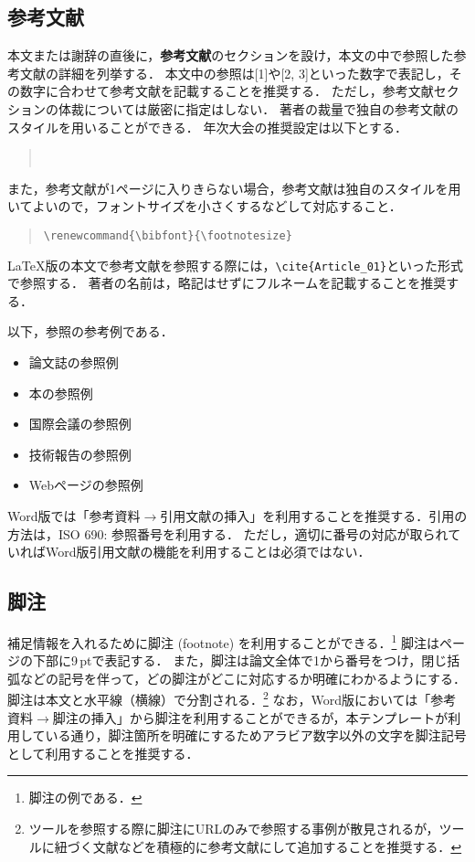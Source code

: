 \documentclass[
  platex, dvipdfmx,  %
]{nlp2025}
\begin{document}
\subsection{参考文献}
本文または謝辞の直後に，\textbf{参考文献}のセクションを設け，本文の中で参照した参考文献の詳細を列挙する．
本文中の参照は[1]や[2, 3]といった数字で表記し，その数字に合わせて参考文献を記載することを推奨する．
ただし，参考文献セクションの体裁については厳密に指定はしない．
著者の裁量で独自の参考文献のスタイルを用いることができる．
年次大会の推奨設定は以下とする．
\begin{quote}
\verb||\\
\verb||
\end{quote}
%
また，参考文献が1ページに入りきらない場合，参考文献は独自のスタイルを用いてよいので，フォントサイズを小さくするなどして対応すること．
\begin{quote}
\verb|\renewcommand{\bibfont}{\footnotesize}|
\end{quote}



LaTeX版の本文で参考文献を参照する際には，\verb|\cite{Article_01}|といった形式で参照する．
%
著者の名前は，略記はせずにフルネームを記載することを推奨する．

以下，参照の参考例である．
\begin{itemize}
\item 論文誌の参照例 \cite{Article_01}
\item 本の参照例 \cite{Book_02}
\item 国際会議の参照例 \cite{Inproc_03}
\item 技術報告の参照例 \cite{Techrep_05}
\item Webページの参照例 \cite{Web_06}
\end{itemize}

Word版では「参考資料$\xrightarrow{}$引用文献の挿入」を利用することを推奨する．引用の方法は，ISO 690: 参照番号を利用する．
ただし，適切に番号の対応が取られていればWord版引用文献の機能を利用することは必須ではない．


\subsection{脚注}
補足情報を入れるために脚注 (footnote) を利用することができる．\footnote{脚注の例である．}
脚注はページの下部に9\,ptで表記する．
また，脚注は論文全体で1から番号をつけ，閉じ括弧などの記号を伴って，どの脚注がどこに対応するか明確にわかるようにする．
脚注は本文と水平線（横線）で分割される．\footnote{ツールを参照する際に脚注にURLのみで参照する事例が散見されるが，ツールに紐づく文献などを積極的に参考文献にして追加することを推奨する．}
なお，Word版においては「参考資料$\xrightarrow{}$脚注の挿入」から脚注を利用することができるが，本テンプレートが利用している通り，脚注箇所を明確にするためアラビア数字以外の文字を脚注記号として利用することを推奨する．
\end{document}
